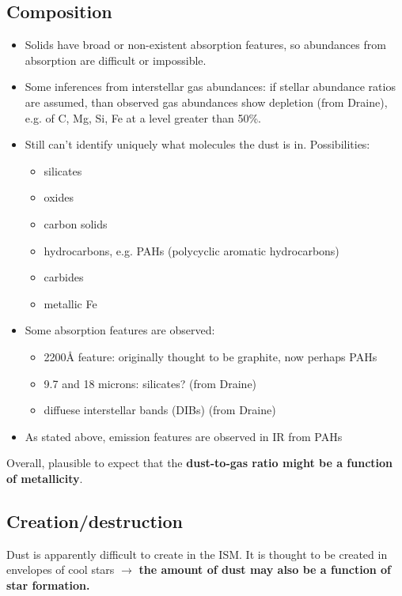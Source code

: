 \documentclass{article}
\begin{document}
\subsection{Composition}
\begin{itemize}
    \item Solids have broad or non-existent absorption features, so abundances
        from absorption are difficult or impossible.
    \item Some inferences from interstellar gas abundances:
        if stellar abundance ratios are assumed, than observed gas abundances
        show depletion (from Draine), e.g. of C, Mg, Si, Fe at a level
        greater than 50\%.
    \item Still can't identify uniquely what molecules the dust is in.
        Possibilities:
        \begin{itemize}
            \item silicates
            \item oxides
            \item carbon solids
            \item hydrocarbons, e.g. PAHs (polycyclic aromatic hydrocarbons)
            \item carbides
            \item metallic Fe
        \end{itemize}
    \item Some absorption features are observed:
        \begin{itemize}
            \item 2200\AA{} feature: originally thought to be graphite,
                now perhaps PAHs
            \item 9.7 and 18 microns: silicates? (from Draine)
            \item diffuese interstellar bands (DIBs) (from Draine)
        \end{itemize}
    \item As stated above, emission features are observed in IR from PAHs
\end{itemize}
Overall, plausible to expect that the \textbf{dust-to-gas ratio might be
a function of metallicity}.

\subsection{Creation/destruction}
Dust is apparently difficult to create in the ISM. It is thought to be
created in envelopes of cool stars $\rightarrow$ \textbf{the amount of dust
may also be a function of star formation.}
\end{document}
